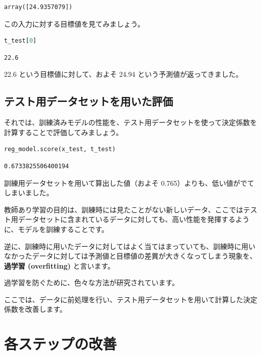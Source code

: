 \begin{lstlisting}[style=outputcell]
array([24.9357079])
\end{lstlisting}

この入力に対する目標値を見てみましょう。


\begin{lstlisting}[style=codecell,language=Python]
t_test[0]
\end{lstlisting}

\begin{lstlisting}[style=outputcell]
22.6
\end{lstlisting}

22.6 という目標値に対して、およそ 24.94 という予測値が返ってきました。


\subsection{テスト用データセットを用いた評価}


それでは、訓練済みモデルの性能を、テスト用データセットを使って決定係数を計算することで評価してみましょう。


\begin{lstlisting}[style=codecell,language=Python]
reg_model.score(x_test, t_test)
\end{lstlisting}

\begin{lstlisting}[style=outputcell]
0.6733825506400194
\end{lstlisting}

訓練用データセットを用いて算出した値（およそ 0.765）よりも、低い値がでてしまいました。


教師あり学習の目的は、訓練時には見たことがない新しいデータ、ここではテスト用データセットに含まれているデータに対しても、高い性能を発揮するように、モデルを訓練することです。

逆に、訓練時に用いたデータに対してはよく当てはまっていても、訓練時に用いなかったデータに対しては予測値と目標値の差異が大きくなってしまう現象を、\textbf{過学習 (overfitting)} と言います。


過学習を防ぐために、色々な方法が研究されています。

ここでは、データに前処理を行い、テスト用データセットを用いて計算した決定係数を改善します。


\section{各ステップの改善}


